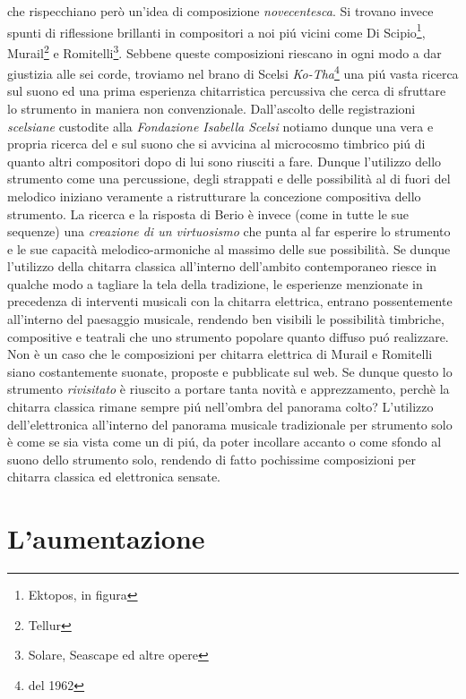 \documentclass[oneside]{article}
\begin{document}
\begin{multicols*}{2}
che rispecchiano però un'idea di composizione \textit{novecentesca}. Si trovano invece spunti di riflessione brillanti in compositori a noi piú vicini come Di Scipio\footnote{Ektopos, in figura}, Murail\footnote{Tellur} e Romitelli\footnote{Solare, Seascape ed altre opere}. Sebbene queste composizioni riescano in ogni modo a dar giustizia alle sei corde, troviamo nel brano di Scelsi \textit{Ko-Tha}\footnote{del 1962} una piú vasta ricerca sul suono ed una prima esperienza chitarristica percussiva che cerca di sfruttare lo strumento in maniera non convenzionale. Dall'ascolto delle registrazioni \textit{scelsiane} custodite alla \textit{Fondazione Isabella Scelsi} notiamo dunque una vera e propria ricerca del e sul suono che si avvicina al microcosmo timbrico piú di quanto altri compositori dopo di lui sono riusciti a fare. Dunque l'utilizzo dello strumento come una percussione, degli strappati e delle possibilità al di fuori del melodico iniziano veramente a ristrutturare la concezione compositiva dello strumento. La ricerca e la risposta di Berio è invece (come in tutte le sue sequenze) una \textit{creazione di un virtuosismo} che punta al far esperire lo strumento e le sue capacità melodico-armoniche al massimo delle sue possibilità. 
Se dunque l'utilizzo della chitarra classica all'interno dell'ambito contemporaneo riesce in qualche modo a tagliare la tela della tradizione, le esperienze menzionate in precedenza di interventi musicali con la chitarra elettrica, entrano possentemente all'interno del paesaggio musicale, rendendo ben visibili le possibilità timbriche, compositive e teatrali che uno strumento popolare quanto diffuso puó realizzare. Non è un caso che le composizioni per chitarra elettrica di Murail e Romitelli siano costantemente suonate, proposte e pubblicate sul web. 
Se dunque questo lo strumento \textit{rivisitato} è riuscito a portare tanta novità e apprezzamento, perchè la chitarra classica rimane sempre piú nell'ombra del panorama colto?
L'utilizzo dell'elettronica all'interno del panorama musicale tradizionale per strumento solo è come se sia vista come un di piú, da poter incollare accanto o come sfondo al suono dello strumento solo, rendendo di fatto pochissime composizioni per chitarra classica ed elettronica sensate.


\section{ L’aumentazione}


\end{multicols*}
\end{document}
